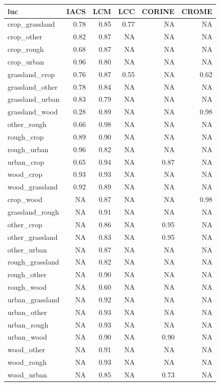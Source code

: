 \documentclass[
]{book}
\begin{document}
\begin{tabular}{l|r|r|r|r|r}
\hline
luc & IACS & LCM & LCC & CORINE & CROME\\
\hline
crop\_grassland & 0.78 & 0.85 & 0.77 & NA & NA\\
\hline
crop\_other & 0.82 & 0.87 & NA & NA & NA\\
\hline
crop\_rough & 0.68 & 0.87 & NA & NA & NA\\
\hline
crop\_urban & 0.96 & 0.80 & NA & NA & NA\\
\hline
grassland\_crop & 0.76 & 0.87 & 0.55 & NA & 0.62\\
\hline
grassland\_other & 0.78 & 0.84 & NA & NA & NA\\
\hline
grassland\_urban & 0.83 & 0.79 & NA & NA & NA\\
\hline
grassland\_wood & 0.28 & 0.89 & NA & NA & 0.98\\
\hline
other\_rough & 0.66 & 0.98 & NA & NA & NA\\
\hline
rough\_crop & 0.89 & 0.90 & NA & NA & NA\\
\hline
rough\_urban & 0.96 & 0.82 & NA & NA & NA\\
\hline
urban\_crop & 0.65 & 0.94 & NA & 0.87 & NA\\
\hline
wood\_crop & 0.93 & 0.93 & NA & NA & NA\\
\hline
wood\_grassland & 0.92 & 0.89 & NA & NA & NA\\
\hline
crop\_wood & NA & 0.87 & NA & NA & 0.98\\
\hline
grassland\_rough & NA & 0.91 & NA & NA & NA\\
\hline
other\_crop & NA & 0.86 & NA & 0.95 & NA\\
\hline
other\_grassland & NA & 0.83 & NA & 0.95 & NA\\
\hline
other\_urban & NA & 0.87 & NA & NA & NA\\
\hline
rough\_grassland & NA & 0.82 & NA & NA & NA\\
\hline
rough\_other & NA & 0.90 & NA & NA & NA\\
\hline
rough\_wood & NA & 0.60 & NA & NA & NA\\
\hline
urban\_grassland & NA & 0.92 & NA & NA & NA\\
\hline
urban\_other & NA & 0.93 & NA & NA & NA\\
\hline
urban\_rough & NA & 0.93 & NA & NA & NA\\
\hline
urban\_wood & NA & 0.90 & NA & 0.90 & NA\\
\hline
wood\_other & NA & 0.91 & NA & NA & NA\\
\hline
wood\_rough & NA & 0.93 & NA & NA & NA\\
\hline
wood\_urban & NA & 0.85 & NA & 0.73 & NA\\
\hline
\end{tabular}
\end{document}
